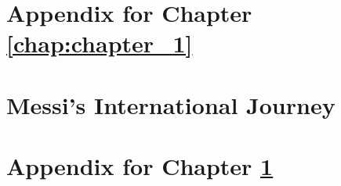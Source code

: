 \documentclass{report}
\begin{document}



\clearpage
\chapter*{Appendix for Chapter \ref{chap:chapter_1}}


\setcounter{section}{0}%
\renewcommand{\thesection}{\arabic{chapter}.\Alph{section}}%
\renewcommand{\theHsection}{ch1.\Alph{section}}%

\setcounter{table}{0}%
\setcounter{figure}{0}%

\renewcommand{\thetable}{\arabic{chapter}.\Alph{table}}%
\captionsetup{labelformat=simple}

\renewcommand{\thefigure}{\arabic{chapter}.\Alph{figure}}%
\captionsetup{labelformat=simple}



\clearpage

\chapter{Messi's International Journey}
\label{chap:chapter_2}


\renewcommand{\thesection}{\arabic{chapter}.\arabic{section}} %

\setcounter{table}{0}%
\setcounter{figure}{0}%

\renewcommand{\thetable}{\arabic{chapter}.\arabic{table}}%
\captionsetup{labelformat=simple}
\renewcommand{\thefigure}{\arabic{chapter}.\arabic{figure}}%
\captionsetup{labelformat=simple}




\clearpage
\chapter*{Appendix for Chapter \ref{chap:chapter_2}}
\end{document}
